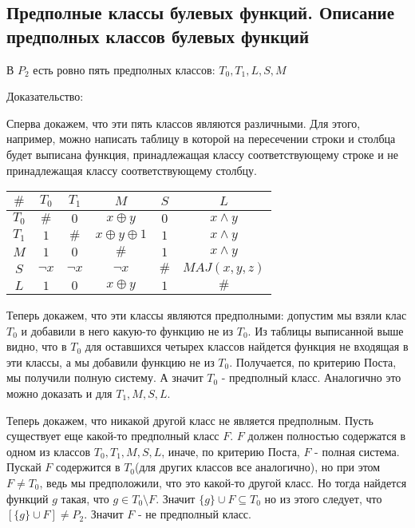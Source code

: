 \subsection{Предполные классы булевых функций. Описание предполных классов булевых функций}

В $P_2$ есть ровно пять предполных классов: $T_0, T_1, L, S, M$

Доказательство:

Сперва докажем, что эти пять классов являются различными. Для этого, например, можно написать таблицу в которой на пересечении строки и столбца будет выписана функция, принадлежащая классу соответствующему строке и не принадлежащая классу соответствующему столбцу.

\begin{tabular}{ |c|c|c|c|c|c| } 
	\hline
	$\#$ & $T_0$ & $T_1$ & $M$ & $S$ & $L$ \\ 
	\hline
	$T_0$ & $\#$ & $0$ & $x \oplus y$ & $0$ & $x \wedge y$\\ 
	\hline
	$T_1$ & $1$ & $\#$ & $x \oplus y \oplus 1$ & $1$ & $x \wedge y$\\ 
	\hline
	$M$ & $1$ & $0$ & $\#$ & $1$ & $x \wedge y$\\ 
	\hline
	$S$ & $\lnot x$ & $\lnot x$ & $\lnot x$ & $\#$ & $MAJ(x, y, z)$\\ 
	\hline
	$L$ & $1$ & $0$ & $x \oplus y$ & $1$ & $\#$\\ 
	\hline
\end{tabular}

Теперь докажем, что эти классы являются предполными: допустим мы взяли клас $T_0$ и добавили в него какую-то функцию не из $T_0$. Из таблицы выписанной выше видно, что в $T_0$ для оставшихся четырех классов найдется функция не входящая в эти классы, а мы добавили функцию не из $T_0$. Получается, по критерию Поста, мы получили полную систему. А значит $T_0$ - предполный класс. Аналогично это можно доказать и для $T_1, M, S, L$.

Теперь докажем, что никакой другой класс не является предполным. Пусть существует еще какой-то предполный класс $F$. $F$ должен полностью содержатся в одном из классов $T_0, T_1, M, S, L$, иначе, по критерию Поста, $F$ - полная система. Пускай $F$ содержится в $T_0$(для других классов все аналогично), но при этом $F \neq T_0$, ведь мы предположили, что это какой-то другой класс. Но тогда найдется функций $g$ такая, что $g \in T_0 \setminus F$. Значит $\{g\} \cup F \subseteq T_0$ но из этого следует, что $[\{g\} \cup F] \neq P_2$. Значит $F$ - не предполный класс. 
